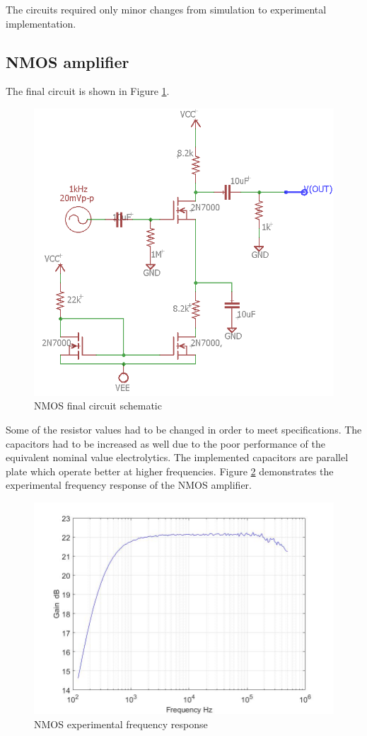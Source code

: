 
The circuits required only minor changes from simulation to experimental implementation.	
	

\subsection{NMOS amplifier}
The final circuit is shown in Figure \ref{fig:nmosexp}.

\begin{figure}[H]
	\centering
	\includegraphics[width=0.7\linewidth]{ExperimentalImplementation/NMOS_exp}
	\caption{NMOS final circuit schematic}
	\label{fig:nmosexp}
\end{figure}
Some of the resistor values had to be changed in order to meet specifications. The capacitors had to be increased as well due to the poor performance of the equivalent nominal value electrolytics. The implemented capacitors are parallel plate which operate better at higher frequencies. Figure \ref{fig:nmosfreq} demonstrates the experimental frequency response of the NMOS amplifier. 


\begin{figure}[H]
	\centering
	\includegraphics[width=0.7\linewidth]{ExperimentalImplementation/nmosamp.jpg}
	\caption{NMOS experimental frequency response}
	\label{fig:nmosfreq}
\end{figure}

